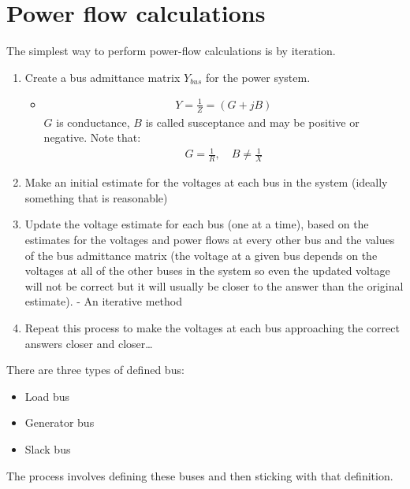 \section{Power flow calculations}
The simplest way to perform power-flow calculations is by iteration.
\begin{enumerate}
	\item Create a bus admittance matrix $Y_{bus}$ for the power system.
	      \begin{itemize}
		      \item \begin{gather}
			            Y = \frac{1}{Z} = \left(G + jB\right)
		            \end{gather}
		            $G$ is conductance, $B$ is called susceptance and may be positive or negative. Note that:
		            \begin{gather}
			            G = \frac{1}{R}, \quad B \neq \frac{1}{X}
		            \end{gather}
	      \end{itemize}
	\item Make an initial estimate for the voltages at each bus in the system (ideally something that is reasonable)
	\item Update the voltage estimate for each bus (one at a time), based on the estimates for the voltages and power flows at every other bus and the values of the bus admittance matrix (the voltage at a given bus depends on the voltages at all of the other buses in the system so even the updated voltage will not be correct but it will usually be closer to the answer than the original estimate). - An iterative method
	\item Repeat this process to make the voltages at each bus approaching the correct answers closer and closer\dots
\end{enumerate}
There are three types of defined bus:
\begin{itemize}
	\item Load bus
	\item Generator bus
	\item Slack bus
\end{itemize}
The process involves defining these buses and then sticking with that definition.
